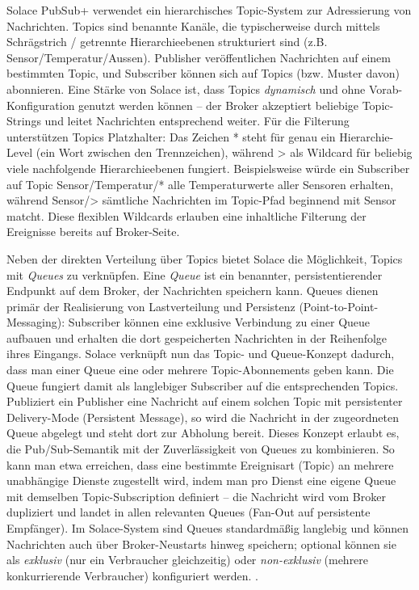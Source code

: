 Solace PubSub+ verwendet ein hierarchisches Topic-System zur Adressierung von Nachrichten. Topics sind benannte Kanäle, die typischerweise durch mittels Schrägstrich / getrennte Hierarchieebenen strukturiert sind (z.B. Sensor/Temperatur/Aussen). Publisher veröffentlichen Nachrichten auf einem bestimmten Topic, und Subscriber können sich auf Topics (bzw. Muster davon) abonnieren. Eine Stärke von Solace ist, dass Topics \textit{dynamisch} und ohne Vorab-Konfiguration genutzt werden können – der Broker akzeptiert beliebige Topic-Strings und leitet Nachrichten entsprechend weiter. Für die Filterung unterstützen Topics Platzhalter: Das Zeichen * steht für genau ein Hierarchie-Level (ein Wort zwischen den Trennzeichen), während > als Wildcard für beliebig viele nachfolgende Hierarchieebenen fungiert. Beispielsweise würde ein Subscriber auf Topic Sensor/Temperatur/* alle Temperaturwerte aller Sensoren erhalten, während Sensor/> sämtliche Nachrichten im Topic-Pfad beginnend mit Sensor matcht. Diese flexiblen Wildcards erlauben eine inhaltliche Filterung der Ereignisse bereits auf Broker-Seite.

Neben der direkten Verteilung über Topics bietet Solace die Möglichkeit, Topics mit \textit{Queues} zu verknüpfen. Eine \textit{Queue} ist ein benannter, persistentierender Endpunkt auf dem Broker, der Nachrichten speichern kann. Queues dienen primär der Realisierung von Lastverteilung und Persistenz (Point-to-Point-Messaging): Subscriber können eine exklusive Verbindung zu einer Queue aufbauen und erhalten die dort gespeicherten Nachrichten in der Reihenfolge ihres Eingangs. Solace verknüpft nun das Topic- und Queue-Konzept dadurch, dass man einer Queue eine oder mehrere Topic-Abonnements geben kann. Die Queue fungiert damit als langlebiger Subscriber auf die entsprechenden Topics. Publiziert ein Publisher eine Nachricht auf einem solchen Topic mit persistenter Delivery-Mode (Persistent Message), so wird die Nachricht in der zugeordneten Queue abgelegt und steht dort zur Abholung bereit. Dieses Konzept erlaubt es, die Pub/Sub-Semantik mit der Zuverlässigkeit von Queues zu kombinieren. So kann man etwa erreichen, dass eine bestimmte Ereignisart (Topic) an mehrere unabhängige Dienste zugestellt wird, indem man pro Dienst eine eigene Queue mit demselben Topic-Subscription definiert – die Nachricht wird vom Broker dupliziert und landet in allen relevanten Queues (Fan-Out auf persistente Empfänger). Im Solace-System sind Queues standardmäßig langlebig und können Nachrichten auch über Broker-Neustarts hinweg speichern; optional können sie als \textit{exklusiv} (nur ein Verbraucher gleichzeitig) oder \textit{non-exklusiv} (mehrere konkurrierende Verbraucher) konfiguriert werden. \cite{SolaceTopicWildcard}.

